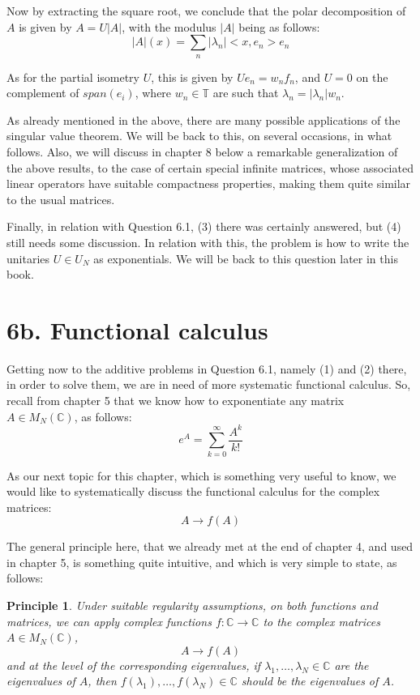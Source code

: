 \documentclass[12pt]{amsbook}
\newtheorem{principle}[theorem]{Principle}
\begin{document}
Now by extracting the square root, we conclude that the polar decomposition of $A$ is given by $A=U|A|$, with the modulus $|A|$ being as follows:
$$|A|(x)=\sum_n|\lambda_n|<x,e_n>e_n$$

As for the partial isometry $U$, this is given by $Ue_n=w_nf_n$, and $U=0$ on the complement of $span(e_i)$, where $w_n\in\mathbb T$ are such that $\lambda_n=|\lambda_n|w_n$.

\bigskip

As already mentioned in the above, there are many possible applications of the singular value theorem. We will be back to this, on several occasions, in what follows. Also, we will discuss in chapter 8 below a remarkable generalization of the above results, to the case of certain special infinite matrices, whose associated linear operators have suitable compactness properties, making them quite similar to the usual matrices.

\bigskip

Finally, in relation with Question 6.1, (3) there was certainly answered, but (4) still needs some discussion. In relation with this, the problem is how to write the unitaries $U\in U_N$ as exponentials. We will be back to this question later in this book.

\section*{6b. Functional calculus}

Getting now to the additive problems in Question 6.1, namely (1) and (2) there, in order to solve them, we are in need of more systematic functional calculus. So, recall from chapter 5 that we know how to exponentiate any matrix $A\in M_N(\mathbb C)$, as follows:
$$e^A=\sum_{k=0}^\infty\frac{A^k}{k!}$$

As our next topic for this chapter, which is something very useful to know, we would like to systematically discuss the functional calculus for the complex matrices:
$$A\to f(A)$$

The general principle here, that we already met at the end of chapter 4, and used in chapter 5, is something quite intuitive, and which is very simple to state, as follows:

\begin{principle}
Under suitable regularity assumptions, on both functions and matrices, we can apply complex functions $f:\mathbb C\to\mathbb C$ to the complex matrices $A\in M_N(\mathbb C)$,
$$A\to f(A)$$
and at the level of the corresponding eigenvalues, if $\lambda_1,\ldots,\lambda_N\in\mathbb C$ are the eigenvalues of $A$, then $f(\lambda_1),\ldots,f(\lambda_N)\in\mathbb C$ should be the eigenvalues of $A$.
\end{principle}
\end{document}
